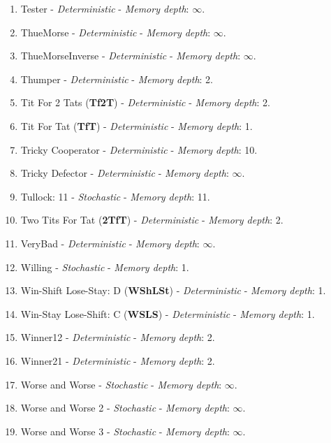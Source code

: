 \documentclass[10pt,letterpaper]{article}
\begin{document}
\begin{enumerate}
\item Tester - \textit{Deterministic} - \textit{Memory depth}: \(\infty\). \cite{Axelrod1980b}
\item ThueMorse - \textit{Deterministic} - \textit{Memory depth}: \(\infty\). \cite{axelrodproject}
\item ThueMorseInverse - \textit{Deterministic} - \textit{Memory depth}: \(\infty\). \cite{axelrodproject}
\item Thumper - \textit{Deterministic} - \textit{Memory depth}: 2. \cite{Ashlock2008}
\item Tit For 2 Tats (\textbf{Tf2T}) - \textit{Deterministic} - \textit{Memory depth}: 2. \cite{Axelrod1984}
\item Tit For Tat (\textbf{TfT}) - \textit{Deterministic} - \textit{Memory depth}: 1. \cite{Axelrod1980}
\item Tricky Cooperator - \textit{Deterministic} - \textit{Memory depth}: 10. \cite{axelrodproject}
\item Tricky Defector - \textit{Deterministic} - \textit{Memory depth}: \(\infty\). \cite{axelrodproject}
\item Tullock: 11 - \textit{Stochastic} - \textit{Memory depth}: 11. \cite{Axelrod1980}
\item Two Tits For Tat (\textbf{2TfT}) - \textit{Deterministic} - \textit{Memory depth}: 2. \cite{Axelrod1984}
\item VeryBad - \textit{Deterministic} - \textit{Memory depth}: \(\infty\). \cite{Andre2013}
\item Willing - \textit{Stochastic} - \textit{Memory depth}: 1. \cite{Berg2015}
\item Win-Shift Lose-Stay: D (\textbf{WShLSt}) - \textit{Deterministic} - \textit{Memory depth}: 1. \cite{Li2011}
\item Win-Stay Lose-Shift: C (\textbf{WSLS}) - \textit{Deterministic} - \textit{Memory depth}: 1. \cite{Kraines1989, Nowak1993, Stewart2012}
\item Winner12 - \textit{Deterministic} - \textit{Memory depth}: 2. \cite{Mathieu2015}
\item Winner21 - \textit{Deterministic} - \textit{Memory depth}: 2. \cite{Mathieu2015}
\item Worse and Worse - \textit{Stochastic} - \textit{Memory depth}: \(\infty\). \cite{Prison1998}
\item Worse and Worse 2 - \textit{Stochastic} - \textit{Memory depth}: \(\infty\). \cite{Prison1998}
\item Worse and Worse 3 - \textit{Stochastic} - \textit{Memory depth}: \(\infty\). \cite{Prison1998}

\end{enumerate}
\end{document}
